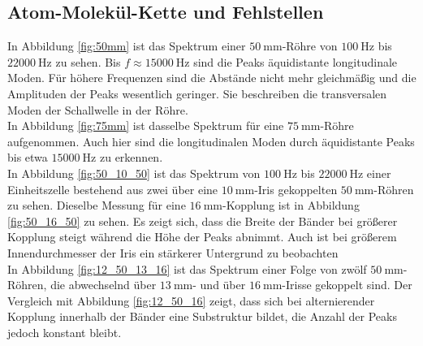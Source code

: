 \subsection{Atom-Molekül-Kette und Fehlstellen}
In Abbildung \ref{fig:50mm} ist das Spektrum einer $\SI{50}{\milli\meter}$-Röhre von $\SI{100}{\hertz}$ bis $\SI{22000}{\hertz}$ zu sehen. Bis $f\approx\SI{15000}{\hertz}$
sind die Peaks äquidistante longitudinale Moden. Für höhere Frequenzen sind die Abstände nicht mehr gleichmäßig und die Amplituden der Peaks wesentlich geringer. Sie beschreiben die transversalen Moden der Schallwelle in der Röhre.\\
In Abbildung \ref{fig:75mm} ist dasselbe Spektrum für eine $\SI{75}{\milli\meter}$-Röhre aufgenommen. Auch hier sind die longitudinalen Moden durch äquidistante Peaks bis etwa $\SI{15000}{\hertz}$ zu erkennen.\\
In Abbildung \ref{fig:50_10_50} ist das Spektrum von $\SI{100}{\hertz}$ bis $\SI{22000}{\hertz}$ einer Einheitszelle bestehend aus zwei über eine $\SI{10}{\milli\meter}$-Iris gekoppelten $\SI{50}{\milli\meter}$-Röhren zu sehen. Dieselbe Messung für eine $\SI{16}{\milli\meter}$-Kopplung ist in Abbildung \ref{fig:50_16_50} zu sehen. Es zeigt sich, dass die Breite der Bänder bei größerer Kopplung steigt während die Höhe der Peaks abnimmt. Auch ist bei größerem Innendurchmesser der Iris ein stärkerer Untergrund zu beobachten\\
In Abbildung \ref{fig:12_50_13_16} ist das Spektrum einer Folge von zwölf $\SI{50}{\milli\meter}$-Röhren, die abwechselnd über $\SI{13}{\milli\meter}$- und über $\SI{16}{\milli\meter}$-Irisse gekoppelt sind. Der Vergleich mit Abbildung \ref{fig:12_50_16} zeigt, dass sich bei alternierender Kopplung innerhalb der Bänder eine Substruktur bildet, die Anzahl der Peaks jedoch konstant bleibt.



